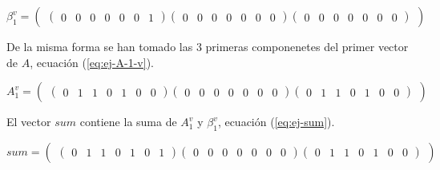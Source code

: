 \begin{equation}\label{eq:ej-beta-1-v}
	{\beta^v_1} = 
		\left(\begin{matrix}
			\left(\begin{smallmatrix}0 & 0 & 0 & 0 & 0 & 0 & 1\end{smallmatrix}\right)			
			\left(\begin{smallmatrix}0 & 0 & 0 & 0 & 0 & 0 & 0\end{smallmatrix}\right)
			\left(\begin{smallmatrix}0 & 0 & 0 & 0 & 0 & 0 & 0\end{smallmatrix}\right)
		\end{matrix}\right)
\end{equation}

De la misma forma se han tomado las $3$ primeras componenetes del primer vector de $A$, ecuación (\ref{eq:ej-A-1-v}).

\begin{equation}\label{eq:ej-A-1-v}
	{A^v_1} = 
		\left(\begin{matrix}
			\left(\begin{smallmatrix}0 & 1 & 1 & 0 & 1 & 0 & 0\end{smallmatrix}\right)			
			\left(\begin{smallmatrix}0 & 0 & 0 & 0 & 0 & 0 & 0\end{smallmatrix}\right)
			\left(\begin{smallmatrix}0 & 1 & 1 & 0 & 1 & 0 & 0\end{smallmatrix}\right)
		\end{matrix}\right)
\end{equation}

El vector $sum$ contiene la suma de $A^v_1$ y $\beta^v_1$, ecuación (\ref{eq:ej-sum}).

\begin{equation}\label{eq:ej-sum}
	{sum} = 
		\left(\begin{matrix}
			\left(\begin{smallmatrix}0 & 1 & 1 & 0 & 1 & 0 & 1\end{smallmatrix}\right)			
			\left(\begin{smallmatrix}0 & 0 & 0 & 0 & 0 & 0 & 0\end{smallmatrix}\right)
			\left(\begin{smallmatrix}0 & 1 & 1 & 0 & 1 & 0 & 0\end{smallmatrix}\right)
		\end{matrix}\right)
\end{equation}

